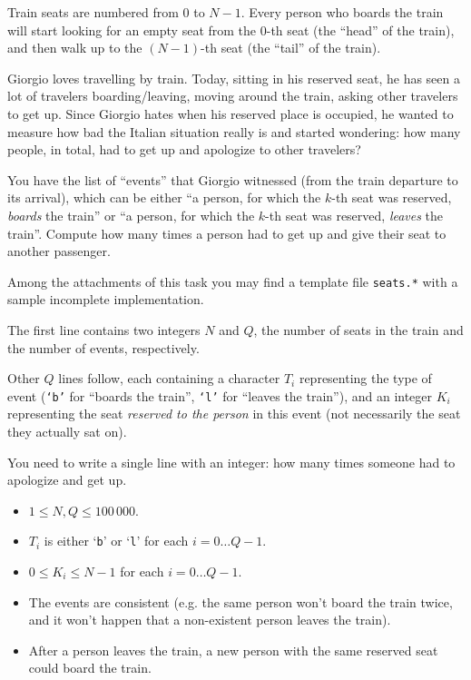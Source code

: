     Train seats are numbered from $0$ to $N-1$. Every person who boards the train will start looking for an empty seat from the $0$-th seat (the ``head'' of the train), and then walk up to the $(N-1)$-th seat (the ``tail'' of the train).

    Giorgio loves travelling by train. Today, sitting in his reserved seat, he has seen a lot of travelers boarding/leaving, moving around the train, asking other travelers to get up. Since Giorgio hates when his reserved place is occupied, he wanted to measure how bad the Italian situation really is and started wondering: how many people, in total, had to get up and apologize to other travelers?

    You have the list of ``events'' that Giorgio witnessed (from the train departure to its arrival), which can be either ``a person, for which the $k$-th seat was reserved, \emph{boards} the train'' or ``a person, for which the $k$-th seat was reserved, \emph{leaves} the train''. Compute how many times a person had to get up and give their seat to another passenger.

\begin{warning}
Among the attachments of this task you may find a template file \texttt{seats.*} with a sample incomplete implementation.
\end{warning}

\InputFile
The first line contains two integers $N$ and $Q$, the number of seats in the train and the number of events, respectively.

Other $Q$ lines follow, each containing a character $T_i$ representing the type of event (\texttt{`b'} for ``boards the train'', \texttt{`l'} for ``leaves the train''), and an integer $K_i$ representing the seat \emph{reserved to the person} in this event (not necessarily the seat they actually sat on).

\OutputFile
You need to write a single line with an integer: how many times someone had to apologize and get up.

\Constraints
\begin{itemize}[nolistsep, itemsep=2mm]
	\item $1 \le N, Q \le 100\,000$.
	\item $T_i$ is either `\texttt{b}' or `\texttt{l}' for each $i=0\ldots Q-1$.
	\item $0 \le K_i \le N - 1$ for each $i=0\ldots Q-1$.
	\item The events are consistent (e.g. the same person won't board the train twice, and it won't happen that a non-existent person leaves the train).
    \item After a person leaves the train, a new person with the same reserved seat could board the train.
\end{itemize}


